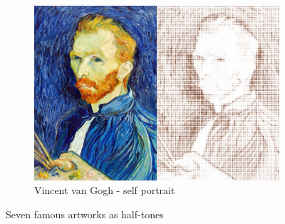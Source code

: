 \begin{figure}[H]
    \begin{subfigure}[b]{0.45\textwidth}
        \centering
        \includegraphics[width=\textwidth]{Figures/day_1/van_gogh.png}
        \caption{Vincent van Gogh - self portrait}
    \end{subfigure}

    \caption{Seven famous artworks as half-tones}
    \label{fig: half-tone art}

\end{figure}